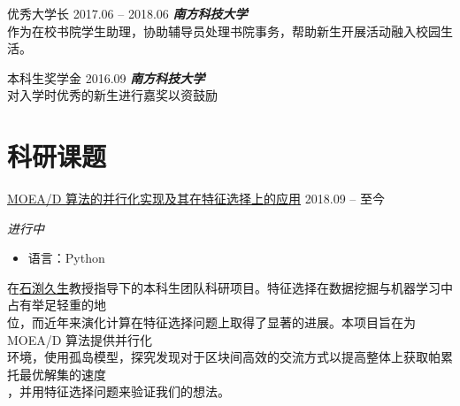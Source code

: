 \documentclass[hidelinks__VERSION__]{adamyi-cv}
\begin{document}
\begin{entrylist}


\entry
{\heir 优秀大学长}
{2017.06 -- 2018.06}
{\hei \emph{\textbf{\hei 南方科技大学}}\\
作为在校书院学生助理，协助辅导员处理书院事务，帮助新生开展活动融入校园生活。
}


\entry
{\heir 本科生奖学金}
{2016.09}
{\hei \emph{\textbf{\hei 南方科技大学}}\\
对入学时优秀的新生进行嘉奖以资鼓励
}


\end{entrylist}


\section{\heir 科研\heir 课题}

\begin{entrylist}


\entry
{\href{https://github.com/hackroid/pMOEA-D}{\heir MOEA/D 算法的并行化实现及其在特征选择上的应用}}
{2018.09 -- \hei 至今}
{\emph{\hei 进行中}
\begin{itemize}
    \item \hei 语言：Python
\end{itemize}
{\hei
在\href{http://cse.sustech.edu.cn/en/people/view/people_id/55/sort_id/9/pid/}{\hei 石渕久生}教授指导下的本科生团队科研项目。特征选择在数据挖掘与机器学习中占有举足轻重的地\\
位，而近年来演化计算在特征选择问题上取得了显著的进展。本项目旨在为 MOEA/D 算法提供并行化\\
环境，使用孤岛模型，探究发现对于区块间高效的交流方式以提高整体上获取帕累托最优解集的速度\\
，并用特征选择问题来验证我们的想法。
}}



\end{entrylist}
\end{document}
